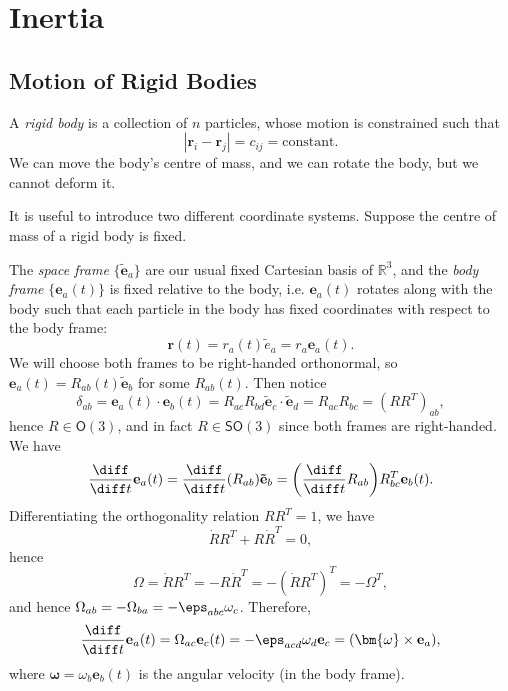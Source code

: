 \documentclass[12pt]{article}
\begin{document}

\newpage

\section{Inertia}
\label{sec:inertia}

\subsection{Motion of Rigid Bodies}
\label{sub:rigid_motion}

A \emph{rigid body} is a collection of $n$ particles, whose motion is constrained such that
\[
	|\mathbf{r}_i - \mathbf{r}_j| = c_{ij} = \text{constant}.
\]
We can move the body's centre of mass, and we can rotate the body, but we cannot deform it.

It is useful to introduce two different coordinate systems. Suppose the centre of mass of a rigid body is fixed.

The \emph{space frame} $\{\mathbf{\tilde e}_a\}$ are our usual fixed Cartesian basis of $\mathbb{R}^3$, and the \emph{body frame} $\{\mathbf{e}_a(t)\}$ is fixed relative to the body, i.e. $\mathbf{e}_a(t)$ rotates along with the body such that each particle in the body has fixed coordinates with respect to the body frame:
\[
\mathbf{r}(t) = r_a(t) \tilde e_a = r_a \mathbf{e}_a(t).
\]
We will choose both frames to be right-handed orthonormal, so $\mathbf{e}_a(t) = R_{ab}(t) \mathbf{\tilde e}_b$ for some $R_{ab}(t)$. Then notice
\[
\delta_{ab} = \mathbf{e}_a(t) \cdot \mathbf{e}_b(t) = R_{ac} R_{bd} \mathbf{\tilde e}_c \cdot \mathbf{\tilde e}_d = R_{ac}R_{bc} = (RR^{T})_{ab},
\]
hence $R \in \mathsf{O}(3)$, and in fact $R \in \mathsf{SO}(3)$ since both frames are right-handed. We have
\[
\frac{\diff}{\diff t}\mathbf{e}_a(t) = \frac{\diff}{\diff t}(R_{ab})\mathbf{\tilde e}_b = \biggl( \frac{\diff}{\diff t} R_{ab} \biggr) R_{bc}^{T} \mathbf{e}_b(t).
\]
Differentiating the orthogonality relation $RR^{T} = 1$, we have
\[
\dot R R^{T} + R \dot R^{T} = 0,
\]
hence
\[
\Omega = \dot R R^{T} = - R \dot R^{T} = -(\dot R R^{T})^{T} = - \Omega^{T},
\]
and hence $\Omega_{ab} = - \Omega_{ba} = -\eps_{abc} \omega_c$. Therefore,
\[
\frac{\diff}{\diff t}\mathbf{e}_a(t) = \Omega_{ac} \mathbf{e}_c(t) = - \eps_{acd} \omega_d \mathbf{e}_c = (\bm{\omega} \times \mathbf{e}_a),
\]
where $\bm{\omega} = \omega_b \mathbf{e}_b(t)$ is the angular velocity (in the body frame).
\end{document}
